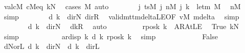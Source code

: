 \begin{isabellebody}
\ valcM\ cM{\isacharunderscore}{\kern0pt}eq\ kN\ \isamarkupfalse%
\ {\isacharparenleft}{\kern0pt}cases\ M{\isacharparenright}{\kern0pt}\ auto\isanewline
\ \ \ \ \ \ \isamarkupfalse%
\ {\isachardoublequoteopen}{\isacharparenleft}{\kern0pt}{\isasymlambda}j{\isachardot}{\kern0pt}\ tsM\ j\ {\isacharparenleft}{\kern0pt}nM\ j{\isacharparenright}{\kern0pt}{\isacharparenright}{\kern0pt}\ k\ {\isacharequal}{\kern0pt}\ le{\isacharunderscore}{\kern0pt}tm\ M{\isachardoublequoteclose}\ \isamarkupfalse%
\ nM{}\ \isamarkupfalse%
\ simp\isanewline
\ \ \ \ \ \ \isamarkupfalse%
\ {\isachardoublequoteopen}d\ k\ {\isasymin}\ {\isacharbraceleft}{\kern0pt}dir{\isachardot}{\kern0pt}N{\isacharcomma}{\kern0pt}\ dir{\isachardot}{\kern0pt}R{\isacharbraceright}{\kern0pt}{\isachardoublequoteclose}\ \isamarkupfalse%
\ valid{\isacharunderscore}{\kern0pt}mttm{\isacharunderscore}{\kern0pt}deltaLE{\isacharbrackleft}{\kern0pt}OF\ vM\ mdelta{\isacharbrackright}{\kern0pt}\ \isamarkupfalse%
\ simp\isanewline
\ \ \ \ \ \ \isamarkupfalse%
\ {\isachardoublequoteopen}d\ k\ {\isacharequal}{\kern0pt}\ dir{\isachardot}{\kern0pt}N{\isachardoublequoteclose}\ \isamarkupfalse%
\ dkR\ \isamarkupfalse%
\ auto\isanewline
\ \ \ \ \ \ \isamarkupfalse%
\ \isamarkupfalse%
\ {\isachardoublequoteopen}{\isacharquery}{\kern0pt}rposk\ k\ {\isacharequal}{\kern0pt}\ AR{\isacharunderscore}{\kern0pt}AtLE{\isachardoublequoteclose}\ \isamarkupfalse%
\ True\ kN\ \isamarkupfalse%
\ simp\isanewline
\ \ \ \ \ \ \isamarkupfalse%
\ \isamarkupfalse%
\ {\isachardoublequoteopen}{}\ {\isacharless}{\kern0pt}\ ar{\isacharunderscore}{\kern0pt}disp\ {\isacharquery}{\kern0pt}k\ {\isacharparenleft}{\kern0pt}d\ k{\isacharparenright}{\kern0pt}\ {\isacharparenleft}{\kern0pt}{\isacharquery}{\kern0pt}rposk\ k{\isacharparenright}{\kern0pt}{\isachardoublequoteclose}\ \isamarkupfalse%
\ simp\isanewline
\ \ \ \ \isamarkupfalse%
\isanewline
\ \ \ \ \ \ \isamarkupfalse%
\ False\isanewline
\ \ \ \ \ \ \isamarkupfalse%
\ dN{\isacharunderscore}{\kern0pt}or{\isacharunderscore}{\kern0pt}L{\isacharcolon}{\kern0pt}\ {\isachardoublequoteopen}d\ k\ {\isacharequal}{\kern0pt}\ dir{\isachardot}{\kern0pt}N\ {\isasymor}\ d\ k\ {\isacharequal}{\kern0pt}\ dir{\isachardot}{\kern0pt}L{\isachardoublequoteclose}\ \isamarkupfalse%

\end{isabellebody}
